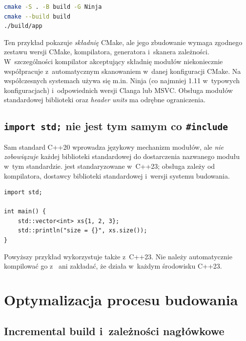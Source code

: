 \begin{lstlisting}[language=bash,caption={Konfiguracja modułów przy użyciu generatora Ninja.}]
cmake -S . -B build -G Ninja
cmake --build build
./build/app
\end{lstlisting}

Ten przykład pokazuje \emph{składnię} CMake, ale jego zbudowanie
wymaga zgodnego zestawu wersji CMake, kompilatora, generatora i~skanera
zależności. W~szczególności kompilator akceptujący składnię modułów
niekoniecznie współpracuje z~automatycznym skanowaniem w~danej
konfiguracji CMake. Na współczesnych systemach używa się m.in.
Ninja (co najmniej 1.11 w~typowych konfiguracjach) i~odpowiednich
wersji Clanga lub MSVC. Obsługa modułów standardowej biblioteki oraz
\emph{header units} ma odrębne ograniczenia.

\subsection{\texttt{import std;} nie jest tym samym co \texttt{\#include}}

Sam standard C++20 wprowadza językowy mechanizm modułów, ale
\emph{nie zobowiązuje} każdej biblioteki standardowej do dostarczenia
nazwanego modułu  w~tym standardzie. 
jest standaryzowane w~C++23; obsługa zależy od kompilatora, dostawcy
biblioteki standardowej i~wersji systemu budowania.

\begin{lstlisting}[caption={Nazwany moduł standardowej biblioteki (C++23, zależny od wsparcia).}]
import std;

int main() {
    std::vector<int> xs{1, 2, 3};
    std::println("size = {}", xs.size());
}
\end{lstlisting}

Powyższy przykład wykorzystuje także  z~C++23.
Nie należy automatycznie kompilować go z~ ani
zakładać, że  działa w~każdym środowisku C++23.

\section{Optymalizacja procesu budowania}
\label{sec:cpp17-build-perf}

\subsection{Incremental build i~zależności nagłówkowe}

